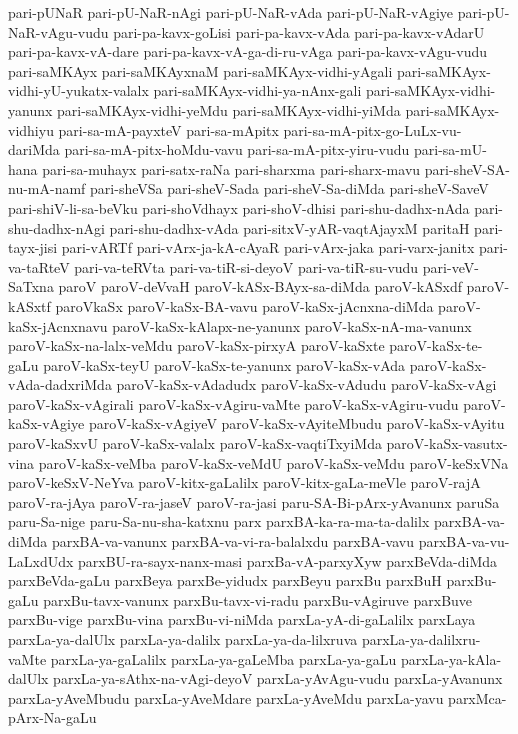 {pari-pUNaR
pari-pU-NaR-nAgi
pari-pU-NaR-vAda
pari-pU-NaR-vAgiye
pari-pU-NaR-vAgu-vudu
pari-pa-kavx-goLisi
pari-pa-kavx-vAda
pari-pa-kavx-vAdarU
pari-pa-kavx-vA-dare
pari-pa-kavx-vA-ga-di-ru-vAga
pari-pa-kavx-vAgu-vudu
pari-saMKAyx
pari-saMKAyxnaM
pari-saMKAyx-vidhi-yAgali
pari-saMKAyx-vidhi-yU-yukatx-valalx
pari-saMKAyx-vidhi-ya-nAnx-gali
pari-saMKAyx-vidhi-yanunx
pari-saMKAyx-vidhi-yeMdu
pari-saMKAyx-vidhi-yiMda
pari-saMKAyx-vidhiyu
pari-sa-mA-payxteV
pari-sa-mApitx
pari-sa-mA-pitx-go-LuLx-vu-dariMda
pari-sa-mA-pitx-hoMdu-vavu
pari-sa-mA-pitx-yiru-vudu
pari-sa-mU-hana
pari-sa-muhayx
pari-satx-raNa
pari-sharxma
pari-sharx-mavu
pari-sheV-SA-nu-mA-namf
pari-sheVSa
pari-sheV-Sada
pari-sheV-Sa-diMda
pari-sheV-SaveV
pari-shiV-li-sa-beVku
pari-shoVdhayx
pari-shoV-dhisi
pari-shu-dadhx-nAda
pari-shu-dadhx-nAgi
pari-shu-dadhx-vAda
pari-sitxV-yAR-vaqtAjayxM
paritaH
pari-tayx-jisi
pari-vARTf
pari-vArx-ja-kA-cAyaR
pari-vArx-jaka
pari-varx-janitx
pari-va-taRteV
pari-va-teRVta
pari-va-tiR-si-deyoV
pari-va-tiR-su-vudu
pari-veV-SaTxna
paroV
paroV-deVvaH
paroV-kASx-BAyx-sa-diMda
paroV-kASxdf
paroV-kASxtf
paroVkaSx
paroV-kaSx-BA-vavu
paroV-kaSx-jAcnxna-diMda
paroV-kaSx-jAcnxnavu
paroV-kaSx-kAlapx-ne-yanunx
paroV-kaSx-nA-ma-vanunx
paroV-kaSx-na-lalx-veMdu
paroV-kaSx-pirxyA
paroV-kaSxte
paroV-kaSx-te-gaLu
paroV-kaSx-teyU
paroV-kaSx-te-yanunx
paroV-kaSx-vAda
paroV-kaSx-vAda-dadxriMda
paroV-kaSx-vAdadudx
paroV-kaSx-vAdudu
paroV-kaSx-vAgi
paroV-kaSx-vAgirali
paroV-kaSx-vAgiru-vaMte
paroV-kaSx-vAgiru-vudu
paroV-kaSx-vAgiye
paroV-kaSx-vAgiyeV
paroV-kaSx-vAyiteMbudu
paroV-kaSx-vAyitu
paroV-kaSxvU
paroV-kaSx-valalx
paroV-kaSx-vaqtiTxyiMda
paroV-kaSx-vasutx-vina
paroV-kaSx-veMba
paroV-kaSx-veMdU
paroV-kaSx-veMdu
paroV-keSxVNa
paroV-keSxV-NeYva
paroV-kitx-gaLalilx
paroV-kitx-gaLa-meVle
paroV-rajA
paroV-ra-jAya
paroV-ra-jaseV
paroV-ra-jasi
paru-SA-Bi-pArx-yAvanunx
paruSa
paru-Sa-nige
paru-Sa-nu-sha-katxnu
parx
parxBA-ka-ra-ma-ta-dalilx
parxBA-va-diMda
parxBA-va-vanunx
parxBA-va-vi-ra-balalxdu
parxBA-vavu
parxBA-va-vu-LaLxdUdx
parxBU-ra-sayx-nanx-masi
parxBa-vA-parxyXyw
parxBeVda-diMda
parxBeVda-gaLu
parxBeya
parxBe-yidudx
parxBeyu
parxBu
parxBuH
parxBu-gaLu
parxBu-tavx-vanunx
parxBu-tavx-vi-radu
parxBu-vAgiruve
parxBuve
parxBu-vige
parxBu-vina
parxBu-vi-niMda
parxLa-yA-di-gaLalilx
parxLaya
parxLa-ya-dalUlx
parxLa-ya-dalilx
parxLa-ya-da-lilxruva
parxLa-ya-dalilxru-vaMte
parxLa-ya-gaLalilx
parxLa-ya-gaLeMba
parxLa-ya-gaLu
parxLa-ya-kAla-dalUlx
parxLa-ya-sAthx-na-vAgi-deyoV
parxLa-yAvAgu-vudu
parxLa-yAvanunx
parxLa-yAveMbudu
parxLa-yAveMdare
parxLa-yAveMdu
parxLa-yavu
parxMca-pArx-Na-gaLu
}
